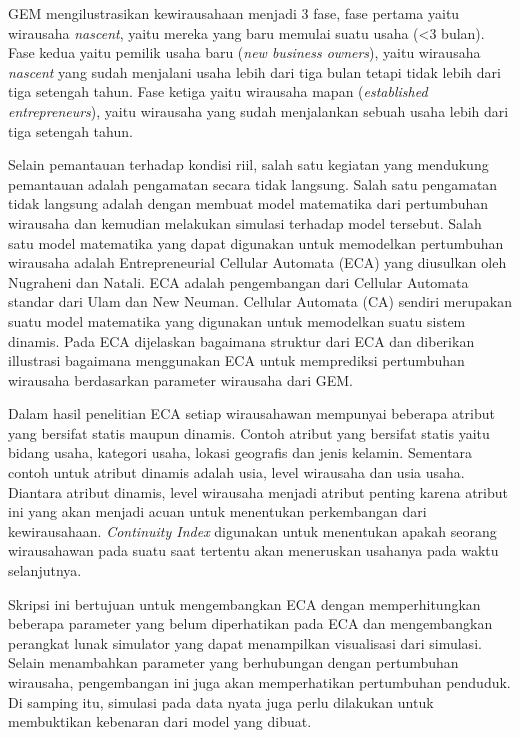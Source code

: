 \documentclass[a4paper,twoside]{article}
\begin{document}
GEM mengilustrasikan kewirausahaan menjadi 3 fase, fase pertama yaitu wirausaha \textit{nascent}, yaitu mereka yang baru memulai suatu usaha (<3 bulan). Fase kedua yaitu pemilik usaha baru (\textit{new business owners}), yaitu wirausaha \textit{nascent} yang sudah menjalani usaha lebih dari tiga bulan tetapi tidak lebih dari tiga setengah tahun. Fase ketiga yaitu wirausaha mapan (\textit{established entrepreneurs}), yaitu wirausaha yang sudah menjalankan sebuah usaha lebih dari tiga setengah tahun.


Selain pemantauan terhadap kondisi riil, salah satu kegiatan yang mendukung pemantauan adalah pengamatan secara tidak langsung. Salah satu pengamatan tidak langsung adalah dengan membuat model matematika dari pertumbuhan wirausaha dan kemudian melakukan simulasi terhadap model tersebut. Salah satu model matematika yang dapat digunakan untuk memodelkan pertumbuhan wirausaha adalah Entrepreneurial Cellular Automata (ECA) yang diusulkan oleh Nugraheni dan Natali. ECA adalah pengembangan dari Cellular Automata standar dari Ulam dan New Neuman. Cellular Automata (CA) sendiri merupakan suatu model matematika yang digunakan untuk memodelkan suatu sistem dinamis. Pada ECA dijelaskan bagaimana struktur dari ECA dan diberikan illustrasi bagaimana menggunakan ECA untuk memprediksi pertumbuhan wirausaha berdasarkan parameter wirausaha dari GEM. 


Dalam hasil penelitian ECA setiap wirausahawan mempunyai beberapa atribut yang bersifat statis maupun dinamis. Contoh atribut yang bersifat statis yaitu bidang usaha, kategori usaha, lokasi geografis dan jenis kelamin. Sementara contoh untuk atribut dinamis adalah usia, level wirausaha dan usia usaha. Diantara atribut dinamis, level wirausaha menjadi atribut penting karena atribut ini yang akan menjadi acuan untuk menentukan perkembangan dari kewirausahaan. \textit{Continuity Index} digunakan untuk menentukan apakah seorang wirausahawan pada suatu saat tertentu akan meneruskan usahanya pada waktu selanjutnya.


Skripsi ini bertujuan untuk mengembangkan ECA dengan memperhitungkan beberapa parameter yang belum diperhatikan pada ECA dan mengembangkan perangkat lunak simulator yang dapat menampilkan visualisasi dari simulasi. Selain menambahkan parameter yang berhubungan dengan pertumbuhan wirausaha, pengembangan ini juga akan memperhatikan pertumbuhan penduduk. Di samping itu, simulasi pada data nyata juga perlu dilakukan untuk membuktikan kebenaran dari model yang dibuat.
\end{document}
